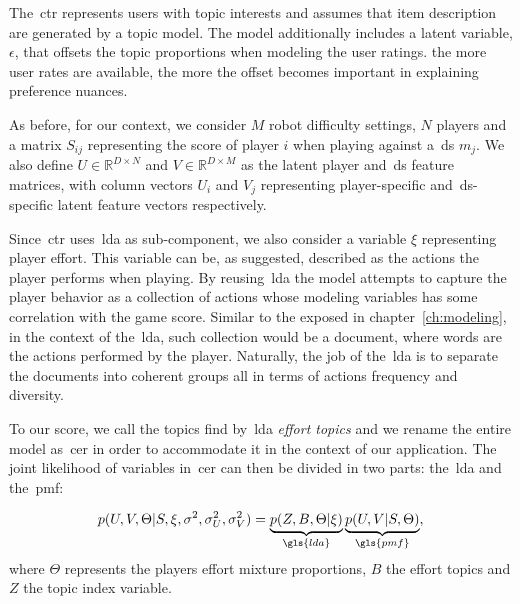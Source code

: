 The~\gls{ctr} represents users with topic interests and assumes that item description are generated by a topic model. The model additionally includes a latent variable, $\epsilon$, that offsets the topic proportions when modeling the user ratings. the more user rates are available, the more the offset becomes important in explaining preference nuances.


As before, for our context, we consider $M$ robot difficulty settings, $N$ players and a matrix $S_{ij}$ representing the score of player $i$ when playing against a~\gls{ds} $m_{j}$. We also define $U \in \mathbb{R}^{D\times N}$ and $V \in \mathbb{R}^{D\times M}$ as the latent player and~\gls{ds} feature matrices, with column vectors $U_i$ and $V_j$ representing player-specific and~\gls{ds}-specific latent feature vectors respectively. 

Since~\gls{ctr} uses~\gls{lda} as sub-component, we also consider a variable $\xi$ representing player effort. This variable can be, as suggested, described as the actions the player performs when playing. By reusing~\gls{lda} the model attempts to capture the player behavior as a collection of actions whose modeling variables has some correlation with the game score. Similar to the exposed in chapter~\ref{ch:modeling}, in the context of the~\gls{lda}, such collection would be a document, where words are the actions performed by the player. Naturally, the job of the~\gls{lda} is to separate the documents into coherent groups all in terms of actions frequency and diversity. 

To our score, we call the topics find by~\gls{lda} \textit{effort topics} and we rename the entire model as~\gls{cer} in order to accommodate it in the context of our application.
The joint likelihood of variables in~\gls{cer} can then be divided in two parts: the~\gls{lda} and the~\gls{pmf}:

\begin{equation}
    p(U,V,\Theta|S,\xi,\sigma^{2},\sigma_{U}^{2},\sigma_{V}^{2}) = \underbrace{p(Z,B, \Theta | \xi)}_{\gls{lda}} \underbrace{p(U,V|S,\Theta)}_{\gls{pmf}},
\end{equation}
where $\Theta$ represents the players effort mixture proportions, $B$ the effort topics and $Z$ the topic index variable. %

